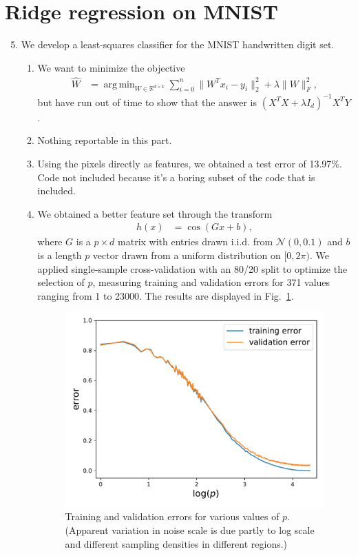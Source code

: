 \documentclass[11pt,letterpaper]{article}
\DeclareMathOperator*{\argmin}{arg\,min}
\numberwithin{equation}{section}
\numberwithin{figure}{section}
\begin{document}
\section{Ridge regression on MNIST}

\begin{enumerate}[label=\arabic*.]
	\setcounter{enumi}{4}
	\item We develop a least-squares classifier for the MNIST handwritten digit set.
	\begin{enumerate}
	\item We want to minimize the objective
	\begin{align*}
		\widehat{W} &= \argmin_{W \in \mathbb{R}^{d \times k}} \sum_{i=0}^n \|W^T x_i - y_i \|_2^2 + \lambda \|W\|_F^2,
	\end{align*}
	but have run out of time to show that the answer is $(X^T X + \lambda I_d)^{-1} X^T Y$.



	\item Nothing reportable in this part.



	\item Using the pixels directly as features, we obtained a test error of 13.97\%. Code not included because it's a boring subset of the code that is included.



	\item We obtained a better feature set through the transform
	\begin{align*}
		h(x) &= \cos\left(G x + b\right),
	\end{align*}
	where $G$ is a $p \times d$ matrix with entries drawn i.i.d. from $\mathcal{N}(0,0.1)$ and $b$ is a length $p$ vector drawn from a uniform distribution on $[0,2\pi)$. We applied single-sample cross-validation with an 80/20 split to optimize the selection of $p$, measuring training and validation errors for 371 values ranging from 1 to 23000. The results are displayed in Fig.~\ref{fig:val}.

	\begin{figure}[H]
		\centering
		\includegraphics[width=.7\textwidth]{figures/val_plot.pdf}
		\caption{Training and validation errors for various values of $p$. (Apparent variation in noise scale is due partly to log scale and different sampling densities in different regions.)}
		\label{fig:val}
	\end{figure}


\end{enumerate}
\end{enumerate}
\end{document}
